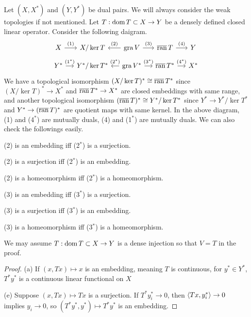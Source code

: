 \documentclass{../../large}
\begin{document}
\begin{prb}
Let $(X,X^*)$ and $(Y,Y^*)$ be dual pairs.
We will always consider the weak topologies if not mentioned.
Let $T:\operatorname{dom} T\subset X\to Y$ be a densely defined closed linear operator.
Consider the following daigram.
\[\begin{tikzcd}[sep=small]
X\rar{(1)}&X/\ker T&\gra V\lar[swap]{(2)}\rar{(3)}&\bar\ran\,T\rar{(4)}&Y\\
Y^*\rar{(1^*)}&Y^*/\ker T^*&\gra V^*\lar[swap]{(2^*)}\rar{(3^*)}&\bar\ran\,T^*\rar{(4^*)}&X^*
\end{tikzcd}\]
We have a topological isomorphism $(X/\ker T)^*\cong\overline{\operatorname{ran}}\,T^*$ since $(X/\ker T)^*\to X^*$ and $\overline{\operatorname{ran}}\,T^*\to X^*$ are closed embeddings with same range, and another topological isomorphism $(\overline{\operatorname{ran}}\,T)^*\cong Y^*/\ker T^*$ since $Y^*\to Y^*/\ker T^*$ and $Y^*\to(\overline{\operatorname{ran}}\,T)^*$ are quotient maps with same kernel.
In the above diagram, (1) and (4$^*$) are mutually duals, (4) and (1$^*$) are mutually duals.
We can also check the followings easily.
\begin{parts}
\item (2) is an embedding iff (2$^*$) is a surjection.
\item (2) is a surjection iff (2$^*$) is an embedding.
\item (2) is a homeomorphism iff (2$^*$) is a homeomorphism.
\item (3) is an embedding iff (3$^*$) is a surjection.
\item (3) is a surjection iff (3$^*$) is an embedding.
\item (3) is a homeomorphism iff (3$^*$) is a homeomorphism.
\end{parts}
We may assume $T:\operatorname{dom} T\subset X\to Y$ is a dense injection so that $V=T$ in the proof.

\end{prb}
\begin{proof}

(a)
If $(x,Tx)\mapsto x$ is an embedding, meaning $T$ is continuous, 
for $y^*\in Y^*$, $T^*y^*$ is a continuous linear functional on $X$

(e)
Suppose $(x,Tx)\mapsto Tx$ is a surjection.
If $T^*y_i^*\to0$, then $\langle Tx,y_i^*\rangle\to0$ implies $y_i\to0$, so $(T^*y^*,y^*)\mapsto T^*y^*$ is an embedding.



\end{proof}
\end{document}
